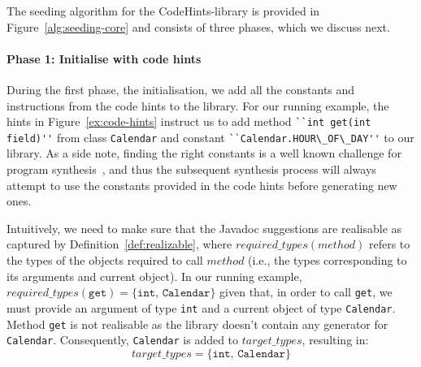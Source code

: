 \documentclass[sigconf,review,anonymous]{acmart}
\begin{document}
The seeding algorithm for the CodeHints-library is provided in Figure~\ref{alg:seeding-core} and consists of three phases, which we discuss next.

\paragraph{{\bf Phase 1: Initialise with code hints}}
During the first phase, the initialisation, we add all the constants and instructions from the code hints to the library.
%
For our running example, the hints in Figure~\ref{ex:code-hints} %
instruct us to add method \lstinline[breaklines=true]{``int get(int field)''} from class
\lstinline[breaklines=true]{Calendar} and constant \lstinline[breaklines=true]{``Calendar.HOUR\_OF\_DAY''} to our library.
As a side note, finding the right constants is a well known
challenge for program synthesis~\cite{DBLP:conf/cav/AbateDKKP18}, and thus the subsequent
synthesis process will always attempt to use the constants provided in the code hints before generating new ones.

Intuitively, we need to make sure that the Javadoc suggestions
are realisable as captured by Definition~\ref{def:realizable}, where 
$required\_types(method)$ refers to the types of the objects required to call $method$ (i.e., the types corresponding to its arguments and current object).
In our running example, $required\_types(\texttt{get}) = \{\texttt{int, Calendar}\}$
given that, in order to call \lstinline[breaklines=true]{get}, we must provide an argument of type \lstinline[breaklines=true]{int} and a current object of type \lstinline[breaklines=true]{Calendar}.
Method \lstinline[breaklines=true]{get} is not realisable as the library doesn't contain any generator for \lstinline[breaklines=true]{Calendar}.
Consequently, \lstinline[breaklines=true]{Calendar} is added to $\mathit{target\_types}$, resulting in:
$$\mathit{target\_types} = \{\texttt{int, Calendar}\}$$
\end{document}
